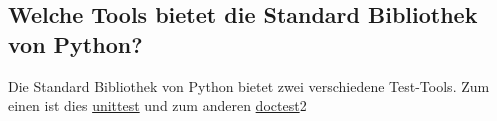 \subsection{Welche Tools bietet die Standard Bibliothek von Python?}\label{python-tools:stdlib}

Die Standard Bibliothek von Python bietet zwei verschiedene Test-Tools\cite{wiki.python:PythonTestingToolsTaxonomy}.
Zum einen ist dies \href{http://pyunit.sourceforge.net/pyunit.html}{unittest} und zum anderen 
\href{https://docs.python.org/3/library/doctest.html}{doctest}2